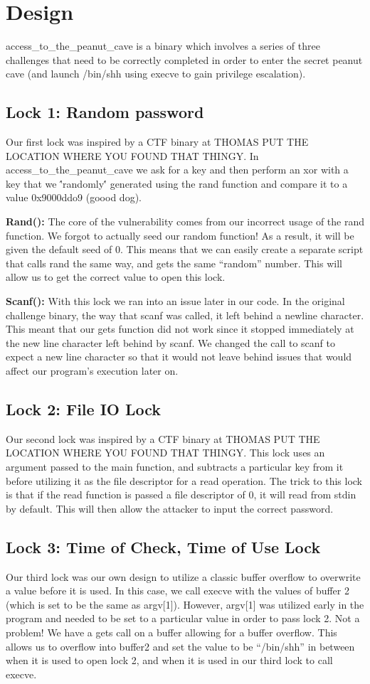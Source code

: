 \section{Design}
access\_to\_the\_peanut\_cave is a binary which involves a series of three challenges that need to be correctly completed in order to enter the secret peanut cave (and launch /bin/shh using execve to gain privilege escalation).

\subsection {Lock 1: Random password}
Our first lock was inspired by a CTF binary at THOMAS PUT THE LOCATION WHERE YOU FOUND THAT THINGY. In access\_to\_the\_peanut\_cave we ask for a key and then perform an xor with a key that we \''randomly\'' generated using the rand function and compare it to a value 0x9000ddo9 (goood dog). 

\textbf{Rand():} The core of the vulnerability comes from our incorrect usage of the rand function. We forgot to actually seed our random function! As a result, it will be given the default seed of 0. This means that we can easily create a separate script that calls rand the same way, and gets the same ``random'' number. This will allow us to get the correct value to open this lock. 

\textbf{Scanf():} With this lock we ran into an issue later in our code. In the original challenge binary, the way that scanf was called, it left behind a newline character. This meant that our gets function did not work since it stopped immediately at the new line character left behind by scanf. We changed the call to scanf to expect a new line character so that it would not leave behind issues that would affect our program's execution later on.

\subsection{Lock 2: File IO Lock}
Our second lock was inspired by a CTF binary at THOMAS PUT THE LOCATION WHERE YOU FOUND THAT THINGY. This lock uses an argument passed to the main function, and subtracts a particular key from it before utilizing it as the file descriptor for a read operation. The trick to this lock is that if the read function is passed a file descriptor of 0, it will read from stdin by default. This will then allow the attacker to input the correct password.

\subsection{Lock 3: Time of Check, Time of Use Lock}
Our third lock was our own design to utilize a classic buffer overflow to overwrite a value before it is used. In this case, we call execve with the values of buffer 2 (which is set to be the same as argv[1]). However, argv[1] was utilized early in the program and needed to be set to a particular value in order to pass lock 2. Not a problem! We have a gets call on a buffer allowing for a buffer overflow. This allows us to overflow into buffer2 and set the value to be ``/bin/shh'' in between when it is used to open lock 2, and when it is used in our third lock to call execve. 